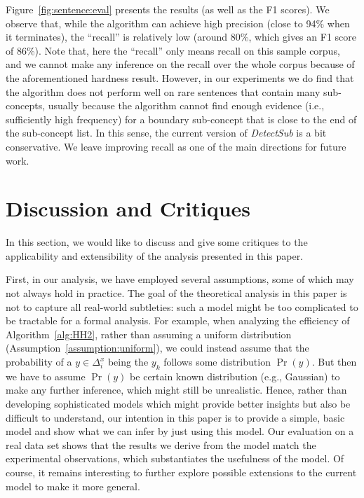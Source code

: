\documentclass[10pt,journal,cspaper,compsoc]{IEEEtran}
\begin{document}
Figure~\ref{fig:sentence:eval} presents the results (as well as the F1 scores).
We observe that, while the algorithm can achieve high precision (close to 94\% when it terminates), the ``recall'' is relatively low (around 80\%, which gives an F1 score of 86\%). Note that, here the ``recall'' only means recall on this sample corpus, and we cannot make any inference on the recall over the whole corpus because of the aforementioned hardness result. 
However, in our experiments we do find that the algorithm does not perform well on rare sentences that contain many sub-concepts, usually because the algorithm cannot find enough evidence (i.e., sufficiently high frequency) for a boundary sub-concept that is close to the end of the sub-concept list.
In this sense, the current version of \emph{DetectSub} is a bit conservative.
We leave improving recall as one of the main directions for future work.


\section{Discussion and Critiques}

In this section, we would like to discuss and give some critiques to the applicability and extensibility of the analysis presented in this paper.

First, in our analysis, we have employed several assumptions, some of which may not always hold in practice.
The goal of the theoretical analysis in this paper is not to capture all real-world subtleties: such a model might be too complicated to be tractable for a formal analysis.
For example, when analyzing the efficiency of Algorithm~\ref{alg:HH2}, rather than assuming a uniform distribution (Assumption~\ref{assumption:uniform}), we could instead assume that the probability of a $y\in\Delta_i^x$ being the $y_k$ follows some distribution $\Pr(y)$.
But then we have to assume $\Pr(y)$ be certain known distribution (e.g., Gaussian) to make any further inference, which might still be unrealistic.
Hence, rather than developing sophisticated models which might provide better insights but also be difficult to understand, our intention in this paper is to provide a simple, basic model and show what we can infer by just using this model.
Our evaluation on a real data set shows that the results we derive from the model match the experimental observations, which substantiates the usefulness of the model.
Of course, it remains interesting to further explore possible extensions to the current model to make it more general.
\end{document}

